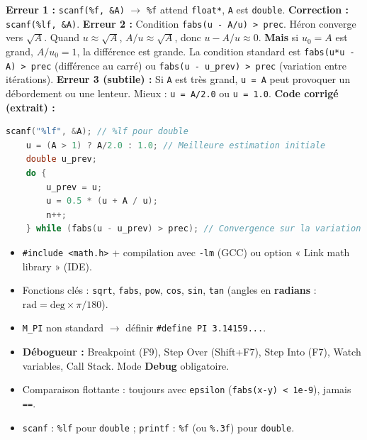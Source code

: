 \documentclass[11pt]{article}
\begin{document}
\begin{corrige}
\textbf{Erreur 1 :} \texttt{scanf(\%f, \&A)} $\to$ \texttt{\%f} attend \texttt{float*}, \texttt{A} est \texttt{double}. \textbf{Correction :} \texttt{scanf(\%lf, \&A)}.
\textbf{Erreur 2 :} Condition \texttt{fabs(u - A/u) > prec}. Héron converge vers $\sqrt{A}$. Quand $u \approx \sqrt{A}$, $A/u \approx \sqrt{A}$, donc $u - A/u \approx 0$. \textbf{Mais} si $u_0 = A$ est grand, $A/u_0 = 1$, la différence est grande. La condition standard est \texttt{fabs(u*u - A) > prec} (différence au carré) ou \texttt{fabs(u - u\_prev) > prec} (variation entre itérations).
\textbf{Erreur 3 (subtile) :} Si \texttt{A} est très grand, \texttt{u = A} peut provoquer un débordement ou une lenteur. Mieux : \texttt{u = A/2.0} ou \texttt{u = 1.0}.
\textbf{Code corrigé (extrait) :}
\begin{lstlisting}[language=C]
    scanf("%lf", &A); // %lf pour double
    u = (A > 1) ? A/2.0 : 1.0; // Meilleure estimation initiale
    double u_prev;
    do {
        u_prev = u;
        u = 0.5 * (u + A / u);
        n++;
    } while (fabs(u - u_prev) > prec); // Convergence sur la variation
\end{lstlisting}
\end{corrige}

\begin{aretenir}
\begin{itemize}
    \item \texttt{\#include <math.h>} + compilation avec \texttt{-lm} (GCC) ou option « Link math library » (IDE).
    \item Fonctions clés : \texttt{sqrt}, \texttt{fabs}, \texttt{pow}, \texttt{cos}, \texttt{sin}, \texttt{tan} (angles en \textbf{radians} : $\text{rad} = \text{deg} \times \pi/180$).
    \item \texttt{M\_PI} non standard $\to$ définir \texttt{\#define PI 3.14159...}.
    \item \textbf{Débogueur :} Breakpoint (F9), Step Over (Shift+F7), Step Into (F7), Watch variables, Call Stack. Mode \textbf{Debug} obligatoire.
    \item Comparaison flottante : toujours avec \texttt{epsilon} (\texttt{fabs(x-y) < 1e-9}), jamais \texttt{==}.
    \item \texttt{scanf} : \texttt{\%lf} pour \texttt{double} ; \texttt{printf} : \texttt{\%f} (ou \texttt{\%.3f}) pour \texttt{double}.
\end{itemize}
\end{aretenir}
\end{document}
